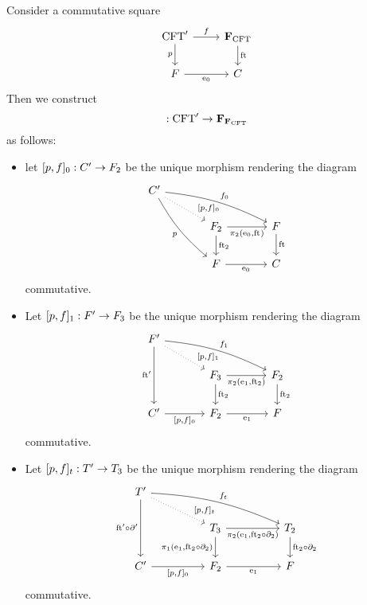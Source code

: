 \begin{defn}\label{famfamstesys_into}
Consider a commutative square
\begin{equation*}
\begin{tikzcd}
\stesys'
  \ar{r}{f}
  \ar{d}[swap]{p}
  &
\famesys\stesys
  \ar{d}{\eft}
  \\
\stesysf \ar{r}[swap]{\ectxext}
  &
\stesysc
\end{tikzcd}
\end{equation*}
Then we construct
\begin{equation*}
[p,f]:\stesys'\to\famesys{\famesys{\stesys}}
\end{equation*}
as follows:
\begin{itemize}
\item let $[p,f]_0:C'\to F_2$ be the unique morphism rendering
the diagram
\begin{equation*}
\begin{tikzcd}[column sep=large]
\stesysc' 
  \ar[bend left=10]{rrd}{f_0}
  \ar[swap,bend right=10]{ddr}{p}
  \ar[dotted]{dr}[near end]{[p,f]_0}
  \\
  {}&
\stesysf_2
  \ar{r}[swap]{\pullbackpr{2}{\ectxext}{\eft}}
  \ar{d}{\eft[2]}
  &
\stesysf
  \ar{d}{\eft}
  \\
  {}&
\stesysf
  \ar{r}[swap]{\ectxext}
  &
\stesysc
\end{tikzcd}
\end{equation*}
commutative.
\item Let $[p,f]_1:F'\to F_3$ be the unique morphism rendering
the diagram
\begin{equation*}
\begin{tikzcd}[column sep=large]
\stesysf'
  \ar[bend left=10]{drr}{f_1}
  \ar[swap]{dd}{\eft'}
  \ar[dotted]{dr}[near end]{[p,f]_1}
  \\
  {}&
\stesysf_3
  \ar{r}[swap]{\pullbackpr{2}{\efamext}{\eft[2]}}
  \ar{d}{\eft[2]}
  &
\stesysf_2
  \ar{d}{\eft[2]}
  \\
\stesysc'
  \ar{r}[swap]{[p,f]_0}
  &
\stesysf_2
  \ar{r}[swap]{\efamext}
  &
\stesysf
\end{tikzcd}
\end{equation*}
commutative.
\item Let $[p,f]_t:T'\to T_3$ be the unique morphism rendering
the diagram
\begin{equation*}
\begin{tikzcd}[column sep=huge]
\stesyst'
  \ar[bend left=10]{drr}{f_t}
  \ar[swap]{dd}{\eft'\circ\ebd'}
  \ar[dotted]{dr}[near end]{[p,f]_t}
  \\
  {}&
\stesyst_3
  \ar{r}[swap]{\pullbackpr{2}{\efamext}{\eft[2]\circ\ebd[2]}}
  \ar{d}[swap]{\pullbackpr{1}{\efamext}{\eft[2]\circ\ebd[2]}}
  &
\stesyst_2
  \ar{d}{\eft[2]\circ\ebd[2]}
  \\
\stesysc'
  \ar{r}[swap]{[p,f]_0}
  &
\stesysf_2
  \ar{r}[swap]{\efamext}
  &
\stesysf
\end{tikzcd}
\end{equation*}
commutative.
\end{itemize}
\end{defn}

